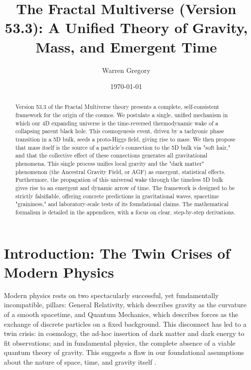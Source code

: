 \documentclass[aps,prd,onecolumn,10pt,superscriptaddress,nofootinbib,floatfix]{revtex4-2}
\begin{document}
\title{The Fractal Multiverse (Version 53.3): A Unified Theory of Gravity, Mass, and Emergent Time}

\author{Warren Gregory}

\date{\today}

\begin{abstract}
Version 53.3 of the Fractal Multiverse theory presents a complete, self-consistent framework for the origin of the cosmos. We postulate a single, unified mechanism in which our 4D expanding universe is the time-reversed thermodynamic wake of a collapsing parent black hole. This cosmogenesis event, driven by a tachyonic phase transition in a 5D bulk, seeds a proto-Higgs field, giving rise to mass. We then propose that mass itself is the source of a particle's connection to the 5D bulk via "soft hair," and that the collective effect of these connections generates all gravitational phenomena. This single process unifies local gravity and the "dark matter" phenomenon (the Ancestral Gravity Field, or AGF) as emergent, statistical effects. Furthermore, the propagation of this universal wake through the timeless 5D bulk gives rise to an emergent and dynamic arrow of time. The framework is designed to be strictly falsifiable, offering concrete predictions in gravitational waves, spacetime "graininess," and laboratory-scale tests of its foundational claims. The mathematical formalism is detailed in the appendices, with a focus on clear, step-by-step derivations.
\end{abstract}

\maketitle

\section{Introduction: The Twin Crises of Modern Physics}
Modern physics rests on two spectacularly successful, yet fundamentally incompatible, pillars: General Relativity, which describes gravity as the curvature of a smooth spacetime, and Quantum Mechanics, which describes forces as the exchange of discrete particles on a fixed background. This disconnect has led to a twin crisis: in cosmology, the ad-hoc insertion of dark matter and dark energy to fit observations; and in fundamental physics, the complete absence of a viable quantum theory of gravity. This suggests a flaw in our foundational assumptions about the nature of space, time, and gravity itself \cite{Verlinde2024}.
\end{document}
